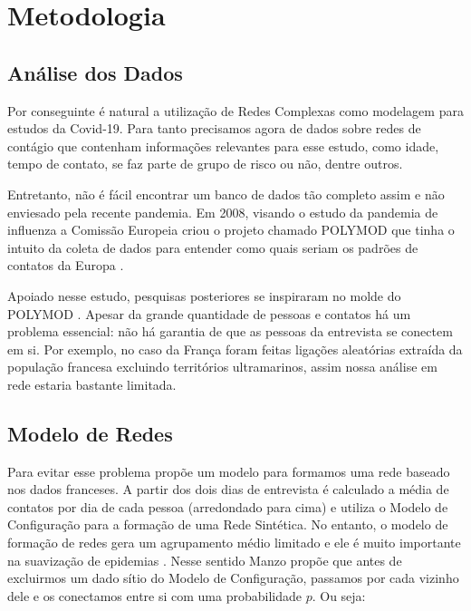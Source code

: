 \chapter{Metodologia}

\section{Análise dos Dados}

Por conseguinte é natural a utilização de Redes Complexas como modelagem para estudos da Covid-19. Para tanto precisamos agora de dados sobre redes de contágio que contenham informações relevantes para esse estudo, como idade, tempo de contato, se faz parte de grupo de risco ou não, dentre outros.

Entretanto, não é fácil encontrar um banco de dados tão completo assim e não enviesado pela recente pandemia. Em 2008, visando o estudo da pandemia de influenza a Comissão Europeia criou o projeto chamado POLYMOD \cite{POLYMOD} que tinha o intuito da coleta de dados para entender como quais seriam os padrões de contatos da Europa \cite{Mossong2008}.

Apoiado nesse estudo, pesquisas posteriores se inspiraram no molde do POLYMOD \cite{Belga2009,Belga2010,China,France,HongKong,Peru,Russia,Thailand,Vietnam,Zambia,Zimbabwe}. Apesar da grande quantidade de pessoas e contatos há um problema essencial: não há garantia de que as pessoas da entrevista se conectem em si. Por exemplo, no caso da França \cite{France} foram feitas ligações aleatórias extraída da população francesa excluindo territórios ultramarinos, assim nossa análise em rede estaria bastante limitada.

\section{Modelo de Redes}

Para evitar esse problema \cite{Manzo2020} propõe um modelo para formamos uma rede baseado nos dados franceses. A partir dos dois dias de entrevista é calculado a média de contatos por dia de cada pessoa (arredondado para cima) e utiliza o Modelo de Configuração para a formação de uma Rede Sintética. No entanto, o modelo de formação de redes gera um agrupamento médio limitado e ele é muito importante na suavização de epidemias \cite{Block2020}. Nesse sentido Manzo propõe que antes de excluirmos um dado sítio do Modelo de Configuração, passamos por cada vizinho dele e os conectamos entre si com uma probabilidade $p$. Ou seja:

